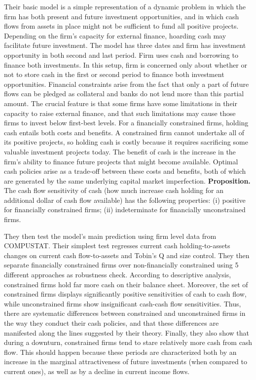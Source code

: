 \documentclass{article}
\begin{document}
{Their basic model is a simple representation of a dynamic problem in which the firm has both present and future investment opportunities, and in which cash flows from assets in place might not be sufficient to fund all positive projects. Depending on the firm's capacity for external finance, hoarding cash may facilitate future investment. The model has three dates and firm has investment opportunity in both second and last period. Firm uses cash and borrowing to finance both investments. In this setup, firm is concerned only about whether or not to store cash in the first or second period to finance both investment opportunities. Financial constraints arise from the fact that only a part of future flows can be pledged as collateral and banks do not lend more than this partial amount. The crucial feature is that some firms have some limitations in their capacity to raise external finance, and that such limitations may cause those firms to invest below first-best levels. For a financially constrained firms, holding cash entails both costs and benefits. A constrained firm cannot undertake all of its positive projects, so holding cash is costly because it requires sacrificing some valuable investment projects today. The benefit of cash is the increase in the firm's ability to finance future projects that might become available. Optimal cash policies arise as a trade-off between these costs and benefits, both of which are generated by the same underlying capital market imperfection. \textbf{Proposition.} The cash flow sensitivity of cash (how much increase cash holding for an additional dollar of cash flow available) has the following properties: (i) positive for financially constrained firms; (ii) indeterminate for financially unconstrained firms.

They then test the model's main prediction using firm level data from COMPUSTAT. Their simplest test regresses current cash holding-to-assets changes on current cash flow-to-assets and Tobin's Q and size control. They then separate financially constrained firms over non-financially constrained using 5 different approaches as robustness check. According to descriptive analysis, constrained firms hold far more cash on their balance sheet. Moreover, the set of constrained firms displays significantly positive sensitivities of cash to cash flow, while unconstrained firms show insignificant cash-cash flow sensitivities. Thus, there are systematic differences between constrained and unconstrained firms in the way they conduct their cash policies, and that these differences are manifested along the lines suggested by their theory. Finally, they also show that during a downturn, constrained firms tend to stare relatively more cash from cash flow. This should happen because these periods are characterized both by an increase in the marginal attractiveness of future investments (when compared to current ones), as well as by a decline in current income flows.




}
\end{document}
